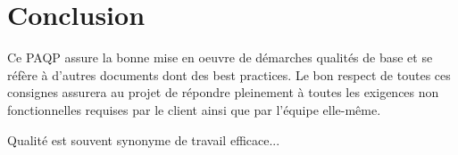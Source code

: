 \section{Conclusion}

Ce PAQP assure la bonne mise en oeuvre de démarches qualités de base et se 
réfère à d'autres documents dont des best practices. Le bon respect de toutes ces 
consignes assurera au projet de répondre pleinement à toutes les exigences non 
fonctionnelles requises par le client ainsi que par l'équipe elle-même.

Qualité est souvent synonyme de travail efficace...

